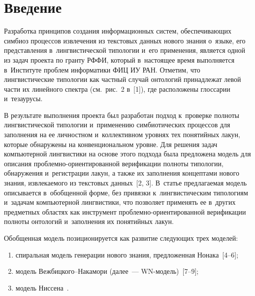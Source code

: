 { 
 



\thispagestyle{headings}

\begin{multicols}{2}

\label{st\stat}
   
\section{Введение}
    
  Разработка принципов создания информационных систем, обеспечивающих 
симбиоз процессов извлечения из текстовых данных нового знания о~языке, его 
представления в~лингвистической типологии и~его применения, является одной 
из задач проекта по гранту РФФИ, который в~настоящее время выполняется 
в~Институте проблем информатики ФИЦ ИУ РАН. Отметим, что 
лингвистические типологии как частный случай онтологий принадлежат левой 
части их линейного спектра (см.\ рис.~2 в~[1]), где расположены глоссарии 
и~тезаурусы.
  
  В результате выполнения проекта был разработан подход к~проверке 
полноты лингвистической типологии и~применению симбиотических процессов 
для заполнения на ее личностном и~коллективном уровнях тех понятийных 
лакун, которые обнаружены на конвенциональном уровне. Для решения задач 
компьютерной лингвистики на основе этого подхода была предложена модель 
для описания проб\-лем\-но-ори\-ен\-ти\-ро\-ван\-ной верификации полноты 
типологии, обнаружения и~регистрации лакун, а также их заполнения 
концептами нового знания, извлекаемого из текстовых данных~[2, 3]. В~статье 
предлагаемая модель описывается в~обобщенной форме, без привязки 
к~лингвистическим типологиям и~задачам компьютерной лингвистики, что 
позволяет применять ее в~других предметных областях как инструмент  
проб\-лем\-но-ори\-ен\-ти\-ро\-ван\-ной верификации полноты онтологий 
и~заполне\-ния их понятийных лакун.
  
  Обобщенная модель позиционируется как развитие следующих трех 
моделей:
  \begin{enumerate}[(1)]
  \item  спиральная модель генерации нового знания, предложенная  
Нонака~[4--6];
  \item модель Веж\-биц\-ко\-го--На\-ка\-мо\-ри (далее~--- WN-мо\-дель)~[7--9];
  \item модель Ниссена~\cite[с.~36]{10-zac}.
  \end{enumerate}
  

\end{multicols}}
